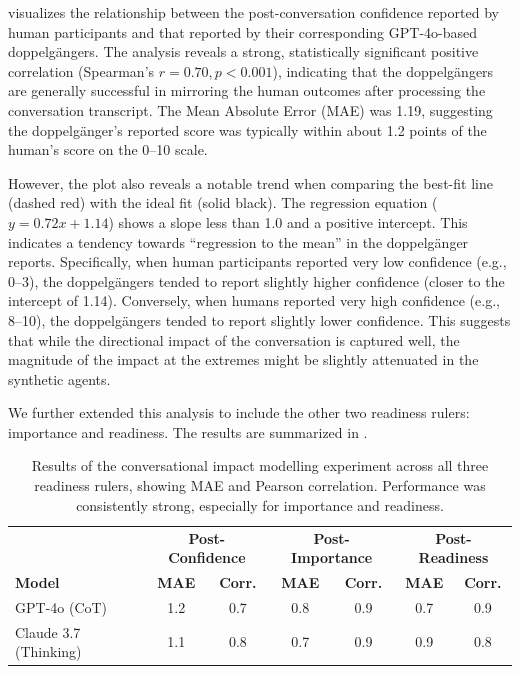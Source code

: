  visualizes the relationship between the post-conversation confidence reported by human participants and that reported by their corresponding GPT-4o-based doppelgängers. The analysis reveals a strong, statistically significant positive correlation (Spearman's $r=0.70, p < 0.001$), indicating that the doppelgängers are generally successful in mirroring the human outcomes after processing the conversation transcript. The Mean Absolute Error (MAE) was 1.19, suggesting the doppelgänger's reported score was typically within about 1.2 points of the human's score on the 0--10 scale.

However, the plot also reveals a notable trend when comparing the best-fit line (dashed red) with the ideal fit (solid black). The regression equation ($y=0.72x+1.14$) shows a slope less than 1.0 and a positive intercept. This indicates a tendency towards ``regression to the mean'' in the doppelgänger reports. Specifically, when human participants reported very low confidence (e.g., 0--3), the doppelgängers tended to report slightly higher confidence (closer to the intercept of 1.14). Conversely, when humans reported very high confidence (e.g., 8--10), the doppelgängers tended to report slightly lower confidence. This suggests that while the directional impact of the conversation is captured well, the magnitude of the impact at the extremes might be slightly attenuated in the synthetic agents.

We further extended this analysis to include the other two readiness rulers: importance and readiness. The results are summarized in .




\begin{table}[!ht]
\centering
\begin{tabular}{l|cc|cc|cc}
\toprule
& \multicolumn{2}{c|}{\textbf{Post-Confidence}} & \multicolumn{2}{c|}{\textbf{Post-Importance}} & \multicolumn{2}{c}{\textbf{Post-Readiness}} \\
\textbf{Model} & \textbf{MAE} & \textbf{Corr.} & \textbf{MAE} & \textbf{Corr.} & \textbf{MAE} & \textbf{Corr.} \\ 
\midrule
GPT-4o (CoT) & 1.2 & 0.7 & 0.8 & 0.9 & 0.7 & 0.9 \\
Claude 3.7 (Thinking) & 1.1 & 0.8 & 0.7 & 0.9 & 0.9 & 0.8 \\ \hline
\end{tabular}
\caption[Multi-ruler conversational impact modelling results]{Results of the conversational impact modelling experiment across all three readiness rulers, showing MAE and Pearson correlation. Performance was consistently strong, especially for importance and readiness.}
\label{tab:autoplay_results_full}
\end{table}

